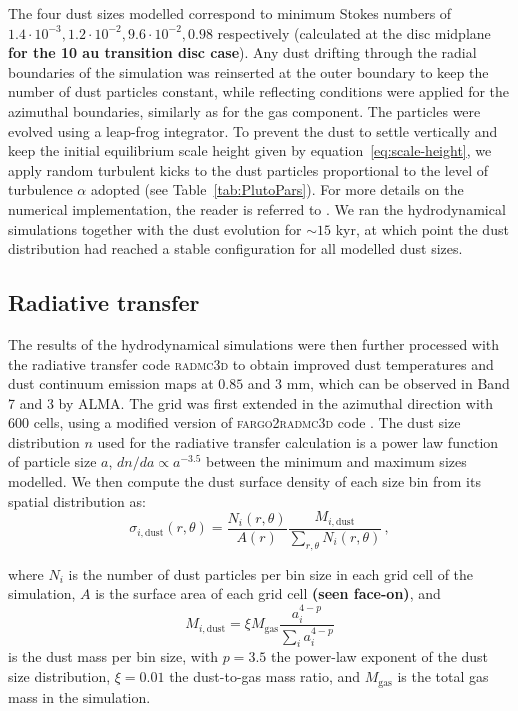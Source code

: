 \documentclass[fleqn,usenatbib]{mnras}
\begin{document}
        The four dust sizes modelled correspond to minimum Stokes numbers of $1.4\cdot10^{-3}, 1.2\cdot10^{-2}, 9.6\cdot10^{-2}, 0.98$ respectively (calculated at the disc midplane \textbf{for the 10 au transition disc case}).
        Any dust drifting through the radial boundaries of the simulation was reinserted at the outer boundary to keep the number of dust particles constant, while reflecting conditions were applied for the azimuthal boundaries, similarly as for the gas component.
        The particles were evolved using a leap-frog integrator.
        To prevent the dust to settle vertically and keep the initial equilibrium scale height given by equation~\ref{eq:scale-height}, we apply random turbulent kicks to the dust particles proportional to the level of turbulence $\alpha$ adopted (see Table~\ref{tab:PlutoPars}). For more details on the numerical implementation, the reader is referred to \cite{Picogna2018}. We ran the hydrodynamical simulations together with the dust evolution for $\sim15$ kyr, at which point the dust distribution had reached a stable configuration for all modelled dust sizes.
        
     \subsection{Radiative transfer} \label{sec:radiative transfer}
     
         The results of the hydrodynamical simulations were then further processed with the radiative transfer code \textsc{radmc3d} \citep{radmc3d} to obtain improved dust temperatures and dust continuum emission maps at $0.85$ and $3$ mm, which can be observed in Band 7 and 3 by ALMA. The grid was first extended in the azimuthal direction with 600 cells, using a modified version of \textsc{fargo2radmc3d} code \citep{Baruteau2019}. The dust size distribution $n$ used for the radiative transfer calculation is a power law function of particle size $a$, $dn/da \propto a^{-3.5}$ between the minimum and maximum sizes modelled. We then compute the dust surface density of each size bin from its spatial distribution as:
         \begin{equation}
            \sigma_{i,\mathrm{dust}}(r,\theta) = \frac{N_i(r,\theta)}{A(r)} \frac{M_{i,\mathrm{dust}}}{\sum_{r,\theta}N_i(r,\theta)}\,,
         \end{equation}

         where $N_i$ is the number of dust particles per bin size in each grid cell of the simulation, $A$ is the surface area of each grid cell \textbf{(seen face-on)}, and 
         \begin{equation}
            M_{i,\mathrm{dust}} = \xi M_\mathrm{gas} \frac{a_i^{4-p}}{\sum_i a_i^{4-p}}
         \end{equation}
         is the dust mass per bin size, with $p=3.5$ the power-law exponent of the dust size distribution, $\xi=0.01$ the dust-to-gas mass ratio, and $M_\mathrm{gas}$ is the total gas mass in the simulation.
\end{document}
